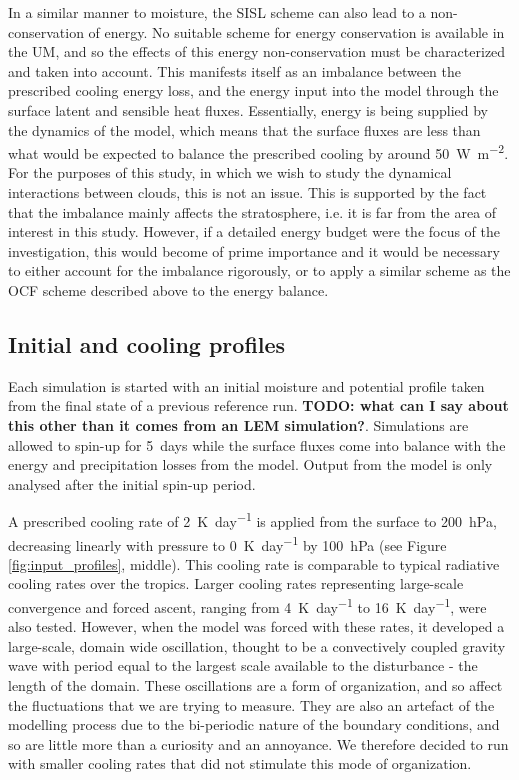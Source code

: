 \documentclass[11pt,a4paper]{article}
\newcommand\todo[1]{\textbf{TODO: #1}}
\begin{document}
In a similar manner to moisture, the SISL scheme can also lead to a non-conservation of energy. No suitable scheme for energy conservation is available in the UM, and so the effects of this energy non-conservation must be characterized and taken into account. This manifests itself as an imbalance between the prescribed cooling energy loss, and the energy input into the model through the surface latent and sensible heat fluxes. Essentially, energy is being supplied by the dynamics of the model, which means that the surface fluxes are less than what would be expected to balance the prescribed cooling by around \SI{50}{W.m^{-2}}.
For the purposes of this study, in which we wish to study the dynamical interactions between clouds, this is not an issue. This is supported by the fact that the imbalance mainly affects the stratosphere, i.e. it is far from the area of interest in this study. However, if a detailed energy budget were the focus of the investigation, this would become of prime importance and it would be necessary to either account for the imbalance rigorously, or to apply a similar scheme as the OCF scheme described above to the energy balance. 

\subsection{Initial and cooling profiles}

Each simulation is started with an initial moisture and potential profile taken from the final state of a previous reference run. \todo{what can I say about this other than it comes from an LEM simulation?}. Simulations are allowed to spin-up for \SI{5}{days} while the surface fluxes come into balance with the energy and precipitation losses from the model. Output from the model is only analysed after the initial spin-up period.

A prescribed cooling rate of \SI{2}{K.day^{-1}} is applied from the surface to \SI{200}{hPa}, decreasing linearly with pressure to \SI{0}{K.day^{-1}} by \SI{100}{hPa} (see Figure \ref{fig:input_profiles}, middle). This cooling rate is comparable to typical radiative cooling rates over the tropics. Larger cooling rates representing large-scale convergence and forced ascent, ranging from \SI{4}{K.day^{-1}} to \SI{16}{K.day^{-1}}, were also tested. However, when the model was forced with these rates, it developed a large-scale, domain wide oscillation, thought to be a convectively coupled gravity wave with period equal to the largest scale available to the disturbance - the length of the domain. These oscillations are a form of organization, and so affect the fluctuations that we are trying to measure. They are also an artefact of the modelling process due to the bi-periodic nature of the boundary conditions, and so are little more than a curiosity and an annoyance. We therefore decided to run with smaller cooling rates that did not stimulate this mode of organization.
\end{document}
